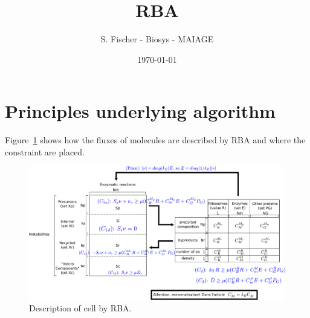\documentclass[12pt]{scrartcl}
\newcommand\reft[3][]{#2~\ref{#3}#1}
\theoremstyle{definition}
\theoremstyle{remark}
\numberwithin{equation}{section}
\newcommand\reffigt[2][]{\reft[#1]{Figure}{#2}}
\begin{document}
\title{RBA}%
\author{S. Fischer - Biosys - MAIAGE}%
\date{\today}%

\maketitle

\newpage

\tableofcontents

\newpage

\section{Principles underlying algorithm}

\reffigt{fig:rba} shows how the fluxes of molecules are described by RBA and where the constraint are placed.

\begin{figure}[ht]
  \centering
  \includegraphics[width=\linewidth]{RBA}
  \caption{Description of cell by RBA.}
  \label{fig:rba}
\end{figure}


\clearpage

\clearpage


\clearpage

\appendix


%
%
\end{document}
